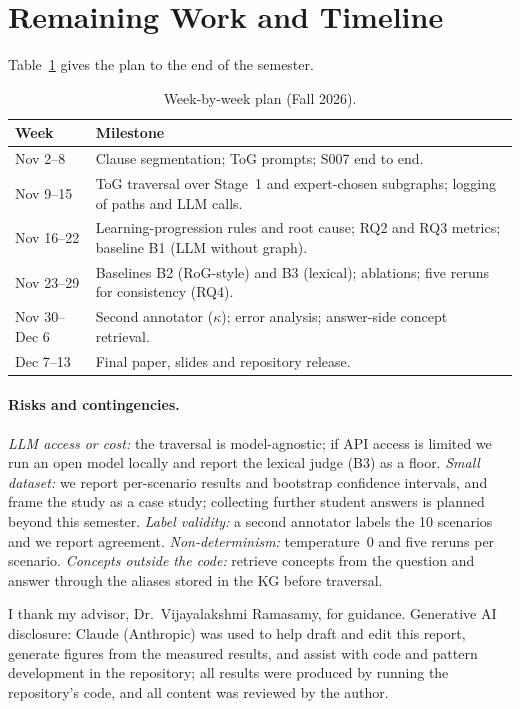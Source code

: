 \documentclass[sigconf,nonacm]{acmart}
\begin{document}
\section{Remaining Work and Timeline}
\label{sec:plan}
Table~\ref{tab:timeline} gives the plan to the end of the semester.

\begin{table}[t]
\caption{Week-by-week plan (Fall 2026).}
\label{tab:timeline}
\small
\begin{tabular}{p{}p{}}
\toprule
Week & Milestone \\
\midrule
Nov 2--8 & Clause segmentation; ToG prompts; S007 end to end. \\
Nov 9--15 & ToG traversal over Stage~1 and expert-chosen subgraphs; logging of paths and LLM calls. \\
Nov 16--22 & Learning-progression rules and root cause; RQ2 and RQ3 metrics; baseline B1 (LLM without graph). \\
Nov 23--29 & Baselines B2 (RoG-style) and B3 (lexical); ablations; five reruns for consistency (RQ4). \\
Nov 30--Dec 6 & Second annotator ($\kappa$); error analysis; answer-side concept retrieval. \\
Dec 7--13 & Final paper, slides and repository release. \\
\bottomrule
\end{tabular}
\end{table}

\paragraph{Risks and contingencies.} \emph{LLM access or cost:} the traversal is model-agnostic; if API access is
limited we run an open model locally and report the lexical judge (B3) as a floor. \emph{Small dataset:} we report
per-scenario results and bootstrap confidence intervals, and frame the study as a case study; collecting further
student answers is planned beyond this semester. \emph{Label validity:} a second annotator labels the 10 scenarios
and we report agreement. \emph{Non-determinism:} temperature~0 and five reruns per scenario. \emph{Concepts outside the
code:} retrieve concepts from the question and answer through the aliases stored in the KG before traversal.

\begin{acks}
I thank my advisor, Dr.\ Vijayalakshmi Ramasamy, for guidance. Generative AI disclosure: Claude (Anthropic) was used to
help draft and edit this report, generate figures from the measured results, and assist with code and pattern
development in the repository; all results were produced by running the repository's code, and all content was
reviewed by the author.
\end{acks}



\end{document}
